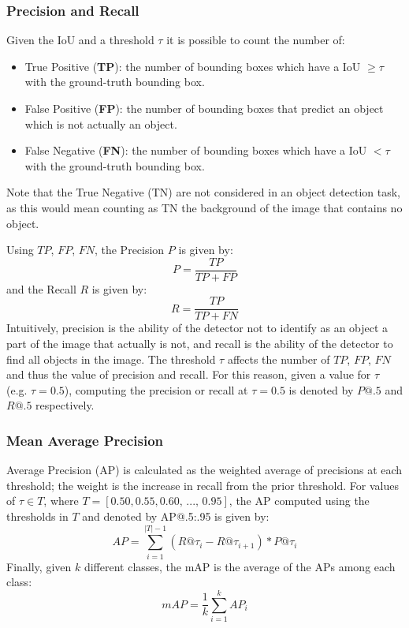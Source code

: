 \subsubsection{Precision and Recall}
Given the IoU and a threshold $\tau$ it is possible to count the number of:
\begin{itemize}
    \item True Positive (\textbf{TP}): the number of bounding boxes which have a IoU $\geq \tau$ with the ground-truth bounding box.
    \item False Positive (\textbf{FP}): the number of bounding boxes that predict an object which is not actually an object.
    \item False Negative (\textbf{FN}): the number of bounding boxes which have a IoU $< \tau$ with the ground-truth bounding box.
\end{itemize}
Note that the True Negative (TN) are not considered in an object detection task, as this would mean counting as TN the background of the image that contains no object.

Using $TP$, $FP$, $FN$, the Precision $P$ is given by:
\begin{equation} %
    P = \frac{TP}{TP + FP}
\end{equation}
and the Recall $R$ is given by:
\begin{equation} %
    R = \frac{TP}{TP + FN}
\end{equation}
Intuitively, precision is the ability of the detector not to identify as an object a part of the image that actually is not, and recall is the ability of the detector to find all objects in the image.
The threshold $\tau$ affects the number of $TP$, $FP$, $FN$ and thus the value of precision and recall.
For this reason, given a value for $\tau$ (e.g. $\tau = 0.5$), computing the precision or recall at $\tau = 0.5$ is denoted by $P@.5$ and $R@.5$ respectively.

\subsubsection{Mean Average Precision}
Average Precision (AP) is calculated as the weighted average of precisions at each threshold; the weight is the increase in recall from the prior threshold. For values of $\tau \in T$, where $T = [0.50, 0.55, 0.60,\, ..., \, 0.95 ]$, the AP computed using the thresholds in $T$ and denoted by AP@.5:.95 is given by:
\begin{equation}
    AP = \sum_{i=1}^{|T| - 1}(R@\tau_i - R@\tau_{i+1} ) * P@\tau_{i}
\end{equation}
Finally, given $k$ different classes, the mAP is the average of the APs among each class:
\begin{equation}
    mAP = \frac{1}{k} \sum_{i=1}^{k} AP_i
\end{equation}

